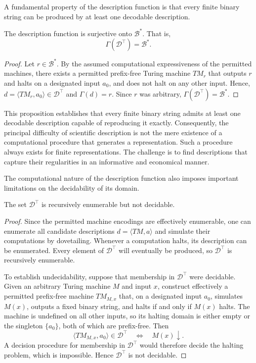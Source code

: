 A fundamental property of the description function is that every finite binary string can be produced by at least one decodable description.

\begin{proposition}
\label{prop:description_function_surjective}
The description function is surjective onto $\mathcal{B}^\ast$. That is,
\[
\Gamma(\mathcal{D}^\top)=\mathcal{B}^\ast.
\]
\end{proposition}
\begin{proof}
Let $r\in\mathcal{B}^\ast$. By the assumed computational expressiveness of the permitted machines, there exists a permitted prefix-free Turing machine $TM_r$ that outputs $r$ and halts on a designated input $a_0$, and does not halt on any other input. Hence, $d=\langle TM_r,a_0\rangle\in\mathcal{D}^\top$ and $\Gamma(d)=r$. Since $r$ was arbitrary, $\Gamma(\mathcal{D}^\top)=\mathcal{B}^\ast$.
\end{proof}

This proposition establishes that every finite binary string admits at least one decodable description capable of reproducing it exactly. Consequently, the principal difficulty of scientific description is not the mere existence of a computational procedure that generates a representation. Such a procedure always exists for finite representations. The challenge is to find descriptions that capture their regularities in an informative and economical manner.

The computational nature of the description function also imposes important limitations on the decidability of its domain.

\begin{proposition}
\label{prop:decodable_descriptions_enumerable}
The set $\mathcal{D}^\top$ is recursively enumerable but not decidable.
\end{proposition}

\begin{proof}
Since the permitted machine encodings are effectively enumerable, one can enumerate all candidate descriptions $d=\langle TM,a\rangle$ and simulate their computations by dovetailing. Whenever a computation halts, its description can be enumerated. Every element of $\mathcal{D}^\top$ will eventually be produced, so $\mathcal{D}^\top$ is recursively enumerable.

To establish undecidability, suppose that membership in $\mathcal{D}^\top$ were decidable. Given an arbitrary Turing machine $M$ and input $x$, construct effectively a permitted prefix-free machine $TM_{M,x}$ that, on a designated input $a_0$, simulates $M(x)$, outputs a fixed binary string, and halts if and only if $M(x)$ halts. The machine is undefined on all other inputs, so its halting domain is either empty or the singleton $\{a_0\}$, both of which are prefix-free. Then
\[
\langle TM_{M,x},a_0\rangle\in\mathcal{D}^\top
\quad\Longleftrightarrow\quad
M(x)\downarrow.
\]
A decision procedure for membership in $\mathcal{D}^\top$ would therefore decide the halting problem, which is impossible. Hence $\mathcal{D}^\top$ is not decidable.
\end{proof}

